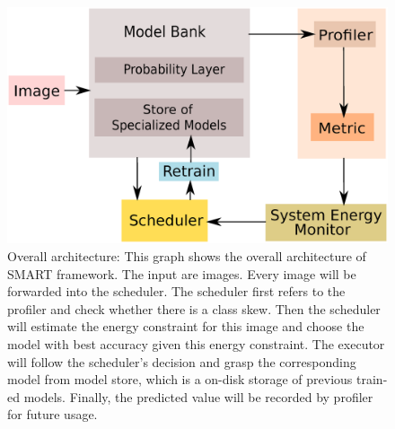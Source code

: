 \documentclass[conference]{IEEEtran}
\begin{document}
\begin{spacing}{0.9}
\begin{figure} 
\includegraphics[scale=0.25]{complexArchitecture.ps}
\caption{Overall architecture: This graph shows the overall architecture of SMART framework. The input are images. Every image will be forwarded into the scheduler. The scheduler first refers to the profiler and check whether there is a class skew. Then the scheduler will estimate the energy constraint for this image and choose the model with best accuracy given this energy constraint. The executor will follow the scheduler's decision and grasp the corresponding model from model store, which is a on-disk storage of previous train-ed models. Finally, the predicted value will be recorded by profiler for future usage.}
\label{fig:Architecture}
\end{figure}



\end{spacing}
\end{document}
